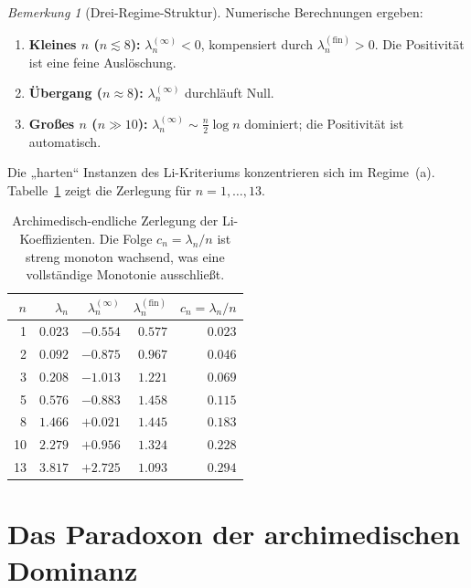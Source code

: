 \documentclass[12pt,a4paper]{article}
\theoremstyle{definition}
\theoremstyle{remark}
\newtheorem{remark}[theorem]{Bemerkung}
\begin{document}
\begin{remark}[Drei-Regime-Struktur]
\label{rem:three-regime}
Numerische Berechnungen ergeben:
\begin{enumerate}[label=(\alph*)]
  \item \textbf{Kleines $n$ ($n \lesssim 8$):} $\lambda_n^{(\infty)} < 0$, kompensiert durch $\lambda_n^{(\mathrm{fin})} > 0$. Die Positivität ist eine feine Auslöschung.
  \item \textbf{Übergang ($n \approx 8$):} $\lambda_n^{(\infty)}$ durchläuft Null.
  \item \textbf{Großes $n$ ($n \gg 10$):} $\lambda_n^{(\infty)} \sim \frac{n}{2}\log n$ dominiert; die Positivität ist automatisch.
\end{enumerate}
Die „harten“ Instanzen des Li-Kriteriums konzentrieren sich im Regime~(a). Tabelle~\ref{tab:li-coefficients} zeigt die Zerlegung für $n = 1, \ldots, 13$.
\end{remark}

\begin{table}[h]
\centering
\renewcommand{\arraystretch}{1.15}
\begin{tabular}{r|r|r|r|r}
$n$ & $\lambda_n$ & $\lambda_n^{(\infty)}$ & $\lambda_n^{(\mathrm{fin})}$ & $c_n = \lambda_n/n$ \\\hline
1 & $0.023$ & $-0.554$ & $0.577$ & $0.023$ \\
2 & $0.092$ & $-0.875$ & $0.967$ & $0.046$ \\
3 & $0.208$ & $-1.013$ & $1.221$ & $0.069$ \\
5 & $0.576$ & $-0.883$ & $1.458$ & $0.115$ \\
8 & $1.466$ & $+0.021$ & $1.445$ & $0.183$ \\
10 & $2.279$ & $+0.956$ & $1.324$ & $0.228$ \\
13 & $3.817$ & $+2.725$ & $1.093$ & $0.294$ \\
\end{tabular}
\caption{Archimedisch-endliche Zerlegung der Li-Koeffizienten. Die Folge $c_n = \lambda_n/n$ ist streng monoton wachsend, was eine vollständige Monotonie ausschließt.}
\label{tab:li-coefficients}
\end{table}


\section{Das Paradoxon der archimedischen Dominanz}
\label{sec:dominance}
\end{document}
